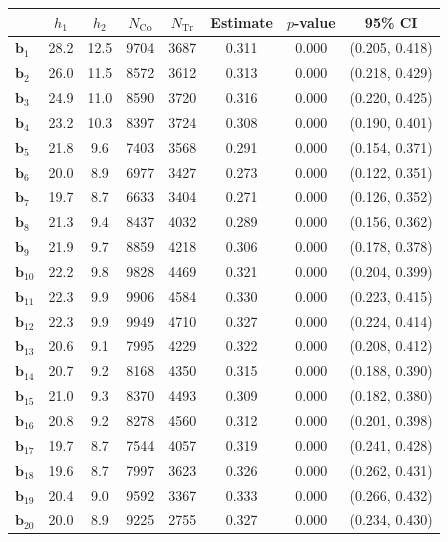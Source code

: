 \documentclass[10pt]{article}
\newcommand{\bb}{\mathbf{b}}
\begin{document}
\begin{table}[p]
    \centering
\begin{tabular}{lccccccc}
  \toprule\toprule
   & $h_1$ & $h_2$ & $N_{\mathrm{Co}}$ & $N_{\mathrm{Tr}}$ & Estimate & $p$-value & 95\% CI \\
  \midrule
   $\bb_{1}$ & 28.2 & 12.5 & 9704 & 3687 & 0.311 & 0.000 & (0.205, 0.418)\\
   $\bb_{2}$ & 26.0 & 11.5 & 8572 & 3612 & 0.313 & 0.000 & (0.218, 0.429)\\
   $\bb_{3}$ & 24.9 & 11.0 & 8590 & 3720 & 0.316 & 0.000 & (0.220, 0.425)\\
   $\bb_{4}$ & 23.2 & 10.3 & 8397 & 3724 & 0.308 & 0.000 & (0.190, 0.401)\\
   $\bb_{5}$ & 21.8 & 9.6 & 7403 & 3568 & 0.291 & 0.000 & (0.154, 0.371)\\
   $\bb_{6}$ & 20.0 & 8.9 & 6977 & 3427 & 0.273 & 0.000 & (0.122, 0.351)\\
   $\bb_{7}$ & 19.7 & 8.7 & 6633 & 3404 & 0.271 & 0.000 & (0.126, 0.352)\\
   $\bb_{8}$ & 21.3 & 9.4 & 8437 & 4032 & 0.289 & 0.000 & (0.156, 0.362)\\
   $\bb_{9}$ & 21.9 & 9.7 & 8859 & 4218 & 0.306 & 0.000 & (0.178, 0.378)\\
   $\bb_{10}$ & 22.2 & 9.8 & 9828 & 4469 & 0.321 & 0.000 & (0.204, 0.399)\\
   $\bb_{11}$ & 22.3 & 9.9 & 9906 & 4584 & 0.330 & 0.000 & (0.223, 0.415)\\
   $\bb_{12}$ & 22.3 & 9.9 & 9949 & 4710 & 0.327 & 0.000 & (0.224, 0.414)\\
   $\bb_{13}$ & 20.6 & 9.1 & 7995 & 4229 & 0.322 & 0.000 & (0.208, 0.412)\\
   $\bb_{14}$ & 20.7 & 9.2 & 8168 & 4350 & 0.315 & 0.000 & (0.188, 0.390)\\
   $\bb_{15}$ & 21.0 & 9.3 & 8370 & 4493 & 0.309 & 0.000 & (0.182, 0.380)\\
   $\bb_{16}$ & 20.8 & 9.2 & 8278 & 4560 & 0.312 & 0.000 & (0.201, 0.398)\\
   $\bb_{17}$ & 19.7 & 8.7 & 7544 & 4057 & 0.319 & 0.000 & (0.241, 0.428)\\
   $\bb_{18}$ & 19.6 & 8.7 & 7997 & 3623 & 0.326 & 0.000 & (0.262, 0.431)\\
   $\bb_{19}$ & 20.4 & 9.0 & 9592 & 3367 & 0.333 & 0.000 & (0.266, 0.432)\\
   $\bb_{20}$ & 20.0 & 8.9 & 9225 & 2755 & 0.327 & 0.000 & (0.234, 0.430)\\

\end{tabular}
\end{table}
\end{document}
